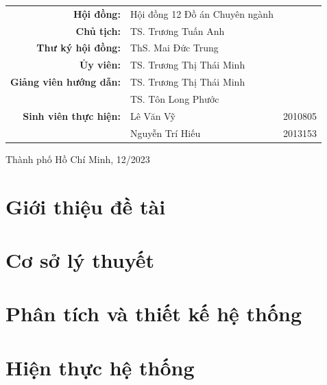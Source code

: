 \documentclass[a4paper]{report}
\begin{document}
\begin{titlepage}
	\begin{table}[H]
		\centering
		\begin{tabular}{rll}
			\textbf{Hội đồng:}             & Hội đồng 12 Đồ án Chuyên ngành &         \\
			\textbf{Chủ tịch:}             & TS. Trương Tuấn Anh            &         \\
			\textbf{Thư ký hội đồng:}      & ThS. Mai Đức Trung             &         \\
			\textbf{Ủy viên:}              & TS. Trương Thị Thái Minh       &         \\
			\textbf{Giảng viên hướng dẫn:} & TS. Trương Thị Thái Minh       &         \\
			                               & TS. Tôn Long Phước             &         \\
			\textbf{Sinh viên thực hiện:}  & Lê Văn Vỹ                      & 2010805 \\
			                               & Nguyễn Trí Hiếu                & 2013153 \\
		\end{tabular}
	\end{table}

	\vspace{3cm}
	\begin{center}
		{\footnotesize Thành phố Hồ Chí Minh, 12/2023}
	\end{center}
\end{titlepage}
\vspace{20cm}

\pagebreak

\pagebreak
\tableofcontents
\pagebreak
{}
\pagebreak
\makeatletter
\makeatother
\listoffigures
\pagebreak
\listoftables
\pagebreak
\printnoidxglossary[type=\acronymtype,title=Danh sách từ ngữ viết tắt]
\pagebreak


\chapter{Giới thiệu đề tài}

\newpage
\chapter{Cơ sở lý thuyết}

\newpage
\chapter{Phân tích và thiết kế hệ thống}

\newpage
\chapter{Hiện thực hệ thống}

\newpage

\newpage

\end{document}
